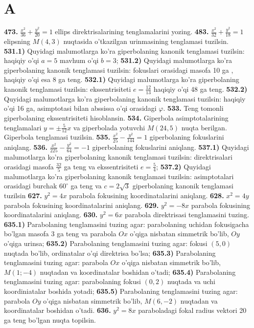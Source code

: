 \section{A}

\textbf{473.} $\frac{x^2}{36}+\frac{y^2}{20}=1$ ellips direktrisalarining tenglamalarini yozing.
\textbf{483.} $\frac{x^2}{32}+\frac{y^2}{18}=1$ elipsning $M(4,3)$ nuqtasida o'tkazilgan urinmasining tenglamasi tuzilsin.
\textbf{531.1)} Quyidagi malumotlarga ko'ra giperbolaning kanonik tenglamasi tuzilsin: haqiqiy o'qi $a=5$ mavhum o'qi $b=3$;
\textbf{531.2)} Quyidagi malumotlarga ko'ra giperbolaning kanonik tenglamasi tuzilsin: fokuslari orasidagi masofa 10 ga , haqiqiy o'qi esa 8 ga teng.
\textbf{532.1)} Quyidagi malumotlarga ko'ra giperbolaning kanonik tenglamasi tuzilsin: ekssentrisiteti $e=\frac{12}{13}$ haqiqiy o'qi 48 ga teng.
\textbf{532.2)} Quyidagi malumotlarga ko'ra giperbolaning kanonik tenglamasi tuzilsin: haqiqiy o'qi 16 ga, asimptotasi bilan abssissa o'qi orasidagi $\varphi$.
\textbf{533.} Teng tomonli giperbolaning ekssentrisiteti hisoblansin.
\textbf{534.} Giperbola asimptotalarining tenglamalari $y= \pm \frac{5}{12} x$ va giperbolada yotuvchi $M(24,5)$ nuqta berilgan. Giperbola tenglamasi tuzilsin.
\textbf{535.} $\frac{x^2}{25}-\frac{y^2}{144}=1$ giperbolaning fokuslarini aniqlang.
\textbf{536.} $\frac{x^2}{225}-\frac{y^2}{64}=-1$ giperbolaning fokuslarini aniqlang.
\textbf{537.1)} Quyidagi malumotlarga ko'ra giperbolaning kanonik tenglamasi tuzilsin: direktrisalari orasidagi masofa $\frac{32}{5}$ ga teng va ekssentrisiteti $e=\frac{5}{4}$;
\textbf{537.2)} Quyidagi malumotlarga ko'ra giperbolaning kanonik tenglamasi tuzilsin: asimptotalari orasidagi burchak $60^{\circ}$ ga teng va $c=2 \sqrt{3}$ giperbolaning kanonik tenglamasi tuzilsin
\textbf{627.} $y^2=4 x$ parabola fokusining koordinatalarini aniqlang.
\textbf{628.} $x^2=4 y$ parabola fokusining koordinatalarini aniqlang.
\textbf{629.} $y^2=-8 x$ parabola fokusining koordinatalarini aniqlang.
\textbf{630.} $y^2=6 x$ parabola direktrisasi tenglamasini tuzing.
\textbf{635.1)} Parabolaning tenglamasini tuzing agar: parabolaning uchidan fokusigacha bo'lgan masofa 3 ga teng va parabola $O x$ o'qiga nisbatan simmetrik bo'lib, $O y$ o'qiga urinsa;
\textbf{635.2)} Parabolaning tenglamasini tuzing agar: fokusi $(5,0)$ nuqtada bo'lib, ordinatalar o'qi direktrisa bo'lsa;
\textbf{635.3)} Parabolaning tenglamasini tuzing agar: parabola $O x$ o'qiga nisbatan simmetrik bo'lib, $M(1 ;-4)$ nuqtadan va koordinatalar boshidan o'tadi;
\textbf{635.4)} Parabolaning tenglamasini tuzing agar: parabolaning fokusi $(0,2)$ nuqtada va uchi koordiniatalar boshida yotadi;
\textbf{635.5)} Parabolaning tenglamasini tuzing agar: parabola $O y$ o'qiga nisbatan simmetrik bo'lib, $M(6,-2)$ nuqtadan va koordinatalar boshidan o'tadi.
\textbf{636.} $y^2=8 x$ paraboladagi fokal radius vektori 20 ga teng bo'lgan nuqta topilsin.



